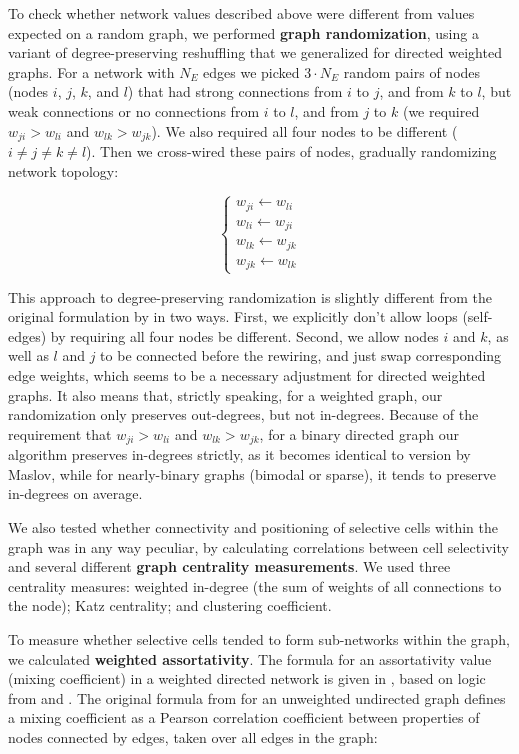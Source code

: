 \documentclass{article}
\begin{document}
To check whether network values described above were different from values expected on a random graph, we performed \textbf{graph randomization}, using a variant of degree-preserving reshuffling \citep{maslov2002} that we generalized for directed weighted graphs. For a network with $N_E$ edges we picked $3\cdot N_E$ random pairs of nodes (nodes $i$, $j$, $k$, and $l$) that had strong connections from $i$ to $j$, and from $k$ to $l$, but weak connections or no connections from $i$ to $l$, and from $j$ to $k$ (we required $w_{ji}>w_{li}$ and $w_{lk}>w_{jk}$). We also required all four nodes to be different ($i \neq j \neq k \neq l$). Then we cross-wired these pairs of nodes, gradually randomizing network topology:

\[ \left \{ \begin{array}{l}  
w_{ji} \leftarrow w_{li} \\ 
w_{li} \leftarrow w_{ji} \\
w_{lk} \leftarrow w_{jk} \\
w_{jk} \leftarrow w_{lk}
\end{array} \right. \]

This approach to degree-preserving randomization is slightly different from the original formulation by \citep{maslov2002} in two ways. First, we explicitly don’t allow loops (self-edges) by requiring all four nodes be different. Second, we allow nodes $i$ and $k$, as well as $l$ and $j$ to be connected before the rewiring, and just swap corresponding edge weights, which seems to be a necessary adjustment for directed weighted graphs. It also means that, strictly speaking, for a weighted graph, our randomization only preserves out-degrees, but not in-degrees. Because of the requirement that $w_{ji}>w_{li}$ and $w_{lk}>w_{jk}$, for a binary directed graph our algorithm preserves in-degrees strictly, as it becomes identical to version by Maslov, while for nearly-binary graphs (bimodal or sparse), it tends to preserve in-degrees on average.

We also tested whether connectivity and positioning of selective cells within the graph was in any way peculiar, by calculating correlations between cell selectivity and several different \textbf{graph centrality measurements}. We used three centrality measures: weighted in-degree (the sum of weights of all connections to the node); Katz centrality; and clustering coefficient.

To measure whether selective cells tended to form sub-networks within the graph, we calculated \textbf{weighted assortativity}. The formula for an assortativity value (mixing coefficient) in a weighted directed network is given in \citep{farine2014weighted}, based on logic from \citep{newman2003mixing} and \citep{leung2007weighted}. The original formula from \citep{newman2003mixing} for an unweighted undirected graph defines a mixing coefficient as a Pearson correlation coefficient between properties of nodes connected by edges, taken over all edges in the graph:
\end{document}
